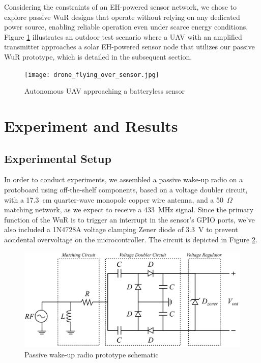 \documentclass[conference]{IEEEtran}
\begin{document}
Considering the constraints of an EH-powered sensor network, we chose to explore passive WuR designs that operate without relying on any dedicated power source, enabling reliable operation even under scarce energy conditions. Figure \ref{fig:drone_over_sensor} illustrates an outdoor test scenario where a UAV with an amplified transmitter approaches a solar EH-powered sensor node that utilizes our passive WuR prototype, which is detailed in the subsequent section.

\begin{figure}[htbp]
  \centerline{\texttt{[image: drone\_flying\_over\_sensor.jpg]}}
  \caption{Autonomous UAV approaching a batteryless sensor}
  \label{fig:drone_over_sensor}
\end{figure}

\section{Experiment and Results}

\subsection{Experimental Setup}

In order to conduct experiments, we assembled a passive wake-up radio on a protoboard using off-the-shelf components, based on a voltage doubler circuit, with a 17.3~cm quarter-wave monopole copper wire antenna, and a 50~$\Omega$ matching network, as we expect to receive a 433~MHz signal. Since the primary function of the WuR is to trigger an interrupt in the sensor's GPIO ports, we've also included a 1N4728A voltage clamping Zener diode of 3.3~V to prevent accidental overvoltage on the microcontroller. The circuit is depicted in Figure \ref{fig:receiver}.

\begin{figure}[htbp]
  \centerline{\includegraphics[width=1\linewidth]{receiver.png}}
  \caption{Passive wake-up radio prototype schematic}
  \label{fig:receiver}
\end{figure}
\end{document}

